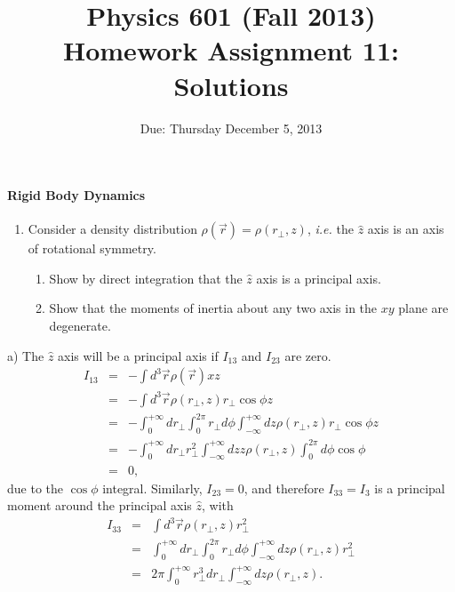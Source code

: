 \documentclass[letterpaper,11pt]{article}
\title{Physics 601 (Fall 2013) \\ Homework Assignment 11: Solutions}
\date{Due: Thursday December 5, 2013}
\begin{document}
\maketitle

\paragraph*{Rigid Body Dynamics}
\begin{enumerate}
 \item Consider a density distribution $\rho(\vec{r}) = \rho(r_\perp,z)$, \textit{i.e.} the $\hat{z}$ axis is an axis of rotational symmetry.
 \begin{enumerate}
  \item Show by direct integration that the $\hat{z}$ axis is a principal axis.
  \item Show that the moments of inertia about any two axis in the $xy$ plane are degenerate.
 \end{enumerate}
\end{enumerate}

a) The $\hat{z}$ axis will be a principal axis if $I_{13}$ and $I_{23}$ are zero.
\begin{eqnarray*}
 I_{13} & = & - \int d^3\vec{r} \rho(\vec{r}) x z \\
 & = & - \int d^3\vec{r} \rho(r_\perp,z) r_\perp \cos\phi z \\
 & = & - \int_0^{+\infty} dr_\perp \int_0^{2\pi} r_\perp d\phi \int_{-\infty}^{+\infty} dz \rho(r_\perp,z) r_\perp \cos\phi z \\
 & = & - \int_0^{+\infty} dr_\perp r_\perp^2 \int_{-\infty}^{+\infty} dz z \rho(r_\perp,z) \int_0^{2\pi} d\phi \cos\phi \\
 & = & 0,
\end{eqnarray*}
due to the $\cos\phi$ integral.  Similarly, $I_{23} = 0$, and therefore $I_{33} = I_3$ is a principal moment around the principal axis $\hat{z}$, with
\begin{eqnarray*}
 I_{33} & = & \int d^3\vec{r} \rho(r_\perp,z) r_\perp^2 \\
 & = & \int_0^{+\infty} dr_\perp \int_0^{2\pi} r_\perp d\phi \int_{-\infty}^{+\infty} dz \rho(r_\perp,z) r_\perp^2 \\
 & = & 2 \pi \int_0^{+\infty} r_\perp^3 dr_\perp \int_{-\infty}^{+\infty} dz \rho(r_\perp,z).
\end{eqnarray*}
\end{document}
